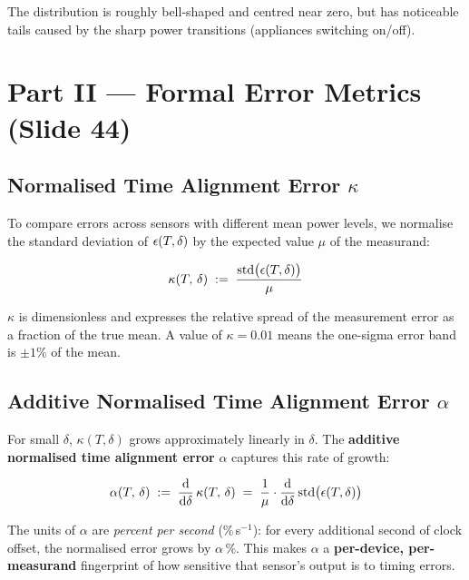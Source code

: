 The distribution is roughly bell-shaped and centred near zero,
but has noticeable tails caused by the sharp power transitions
(appliances switching on/off).
 
\section{Part II --- Formal Error Metrics (Slide 44)}
 
\subsection{Normalised Time Alignment Error $\kappa$}
 
To compare errors across sensors with different mean power
levels, we normalise the standard deviation of
$\epsilon(T,\delta)$ by the expected value $\mu$ of the measurand:
 
\begin{equation}
  \kappa(T,\,\delta)
  \;:=\;
  \frac{\mathrm{std}\bigl(\epsilon(T,\delta)\bigr)}{\mu}
  \label{eq:kappa}
\end{equation}
 
$\kappa$ is dimensionless and expresses the relative spread of
the measurement error as a fraction of the true mean. A value of
$\kappa = 0.01$ means the one-sigma error band is $\pm 1\%$ of
the mean.
 
\subsection{Additive Normalised Time Alignment Error $\alpha$}
 
For small $\delta$, $\kappa(T,\delta)$ grows approximately
linearly in $\delta$. The \textbf{additive normalised time
alignment error} $\alpha$ captures this rate of growth:
 
\begin{equation}
  \alpha(T,\,\delta)
  \;:=\;
  \frac{\mathrm{d}}{\mathrm{d}\delta}\,\kappa(T,\,\delta)
  \;=\;
  \frac{1}{\mu}
  \cdot
  \frac{\mathrm{d}}{\mathrm{d}\delta}\,
  \mathrm{std}\bigl(\epsilon(T,\delta)\bigr)
  \label{eq:alpha}
\end{equation}
 
The units of $\alpha$ are \emph{percent per second}
(\%\,s$^{-1}$): for every additional second of clock offset,
the normalised error grows by $\alpha$\,\%. This makes $\alpha$
a \textbf{per-device, per-measurand} fingerprint of how sensitive
that sensor's output is to timing errors.
 
